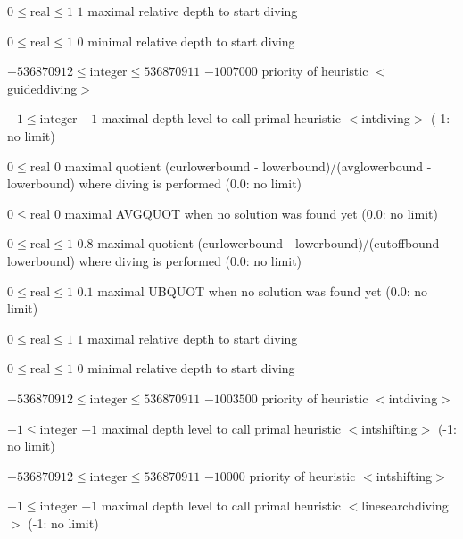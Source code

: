 %
{$0\leq\textrm{real}\leq1$}%
{$1$}%
{maximal relative depth to start diving}%
{}

%
{$0\leq\textrm{real}\leq1$}%
{$0$}%
{minimal relative depth to start diving}%
{}

%
{$-536870912\leq\textrm{integer}\leq536870911$}%
{$-1007000$}%
{priority of heuristic $<$guideddiving$>$}%
{}

%
{$-1\leq\textrm{integer}$}%
{$-1$}%
{maximal depth level to call primal heuristic $<$intdiving$>$ (-1: no limit)}%
{}

%
{$0\leq\textrm{real}$}%
{$0$}%
{maximal quotient (curlowerbound - lowerbound)/(avglowerbound - lowerbound) where diving is performed (0.0: no limit)}%
{}

%
{$0\leq\textrm{real}$}%
{$0$}%
{maximal AVGQUOT when no solution was found yet (0.0: no limit)}%
{}

%
{$0\leq\textrm{real}\leq1$}%
{$0.8$}%
{maximal quotient (curlowerbound - lowerbound)/(cutoffbound - lowerbound) where diving is performed (0.0: no limit)}%
{}

%
{$0\leq\textrm{real}\leq1$}%
{$0.1$}%
{maximal UBQUOT when no solution was found yet (0.0: no limit)}%
{}

%
{$0\leq\textrm{real}\leq1$}%
{$1$}%
{maximal relative depth to start diving}%
{}

%
{$0\leq\textrm{real}\leq1$}%
{$0$}%
{minimal relative depth to start diving}%
{}

%
{$-536870912\leq\textrm{integer}\leq536870911$}%
{$-1003500$}%
{priority of heuristic $<$intdiving$>$}%
{}

%
{$-1\leq\textrm{integer}$}%
{$-1$}%
{maximal depth level to call primal heuristic $<$intshifting$>$ (-1: no limit)}%
{}

%
{$-536870912\leq\textrm{integer}\leq536870911$}%
{$-10000$}%
{priority of heuristic $<$intshifting$>$}%
{}

%
{$-1\leq\textrm{integer}$}%
{$-1$}%
{maximal depth level to call primal heuristic $<$linesearchdiving$>$ (-1: no limit)}%
{}


